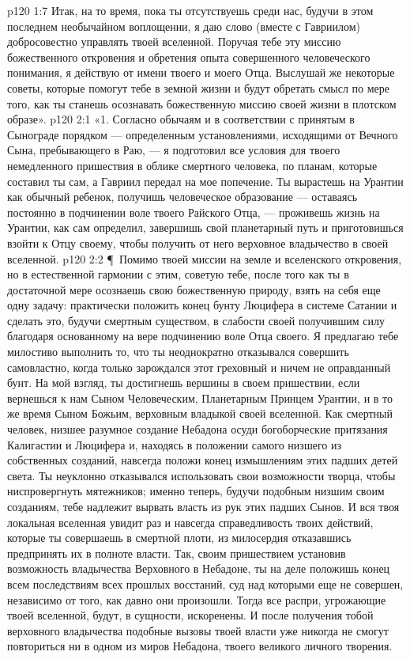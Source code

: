 \vs p120 1:7 Итак, на то время, пока ты отсутствуешь среди нас, будучи в этом последнем необычайном воплощении, я даю слово (вместе с Гавриилом) добросовестно управлять твоей вселенной. Поручая тебе эту миссию божественного откровения и обретения опыта совершенного человеческого понимания, я действую от имени твоего и моего Отца. Выслушай же некоторые советы, которые помогут тебе в земной жизни и будут обретать смысл по мере того, как ты станешь осознавать божественную миссию своей жизни в плотском образе».
\vs p120 2:1 «1. Согласно обычаям и в соответствии с принятым в Сынограде порядком --- определенным установлениями, исходящими от Вечного Сына, пребывающего в Раю, --- я подготовил все условия для твоего немедленного пришествия в облике смертного человека, по планам, которые составил ты сам, а Гавриил передал на мое попечение. Ты вырастешь на Урантии как обычный ребенок, получишь человеческое образование --- оставаясь постоянно в подчинении воле твоего Райского Отца, --- проживешь жизнь на Урантии, как сам определил, завершишь свой планетарный путь и приготовишься взойти к Отцу своему, чтобы получить от него верховное владычество в своей вселенной.
\vs p120 2:2 \P\ \bibnobreakspace Помимо твоей миссии на земле и вселенского откровения, но в естественной гармонии с этим, советую тебе, после того как ты в достаточной мере осознаешь свою божественную природу, взять на себя еще одну задачу: практически положить конец бунту Люцифера в системе Сатании и сделать это, будучи  смертным существом, в слабости своей получившим силу благодаря основанному на вере подчинению воле Отца своего. Я предлагаю тебе милостиво выполнить то, что ты неоднократно отказывался совершить самовластно, когда только зарождался этот греховный и ничем не оправданный бунт. На мой взгляд, ты достигнешь вершины в своем пришествии, если вернешься к нам Сыном Человеческим, Планетарным Принцем Урантии, и в то же время Сыном Божьим, верховным владыкой своей вселенной. Как смертный человек, низшее разумное создание Небадона осуди богоборческие притязания Калигастии и Люцифера и, находясь в положении самого низшего из собственных созданий, навсегда положи конец измышлениям этих падших детей света. Ты неуклонно отказывался использовать свои возможности творца, чтобы ниспровергнуть мятежников; именно теперь, будучи подобным низшим своим созданиям, тебе надлежит вырвать власть из рук этих падших Сынов. И вся твоя локальная вселенная увидит раз и навсегда справедливость твоих действий, которые ты совершаешь в смертной плоти, из милосердия отказавшись предпринять их в полноте власти. Так, своим пришествием установив возможность владычества Верховного в Небадоне, ты на деле положишь конец всем последствиям всех прошлых восстаний, суд над которыми еще не совершен, независимо от того, как давно они произошли. Тогда все распри, угрожающие твоей вселенной, будут, в сущности, искоренены. И после получения тобой верховного владычества подобные вызовы твоей власти уже никогда не смогут повториться ни в одном из миров Небадона, твоего великого личного творения.

